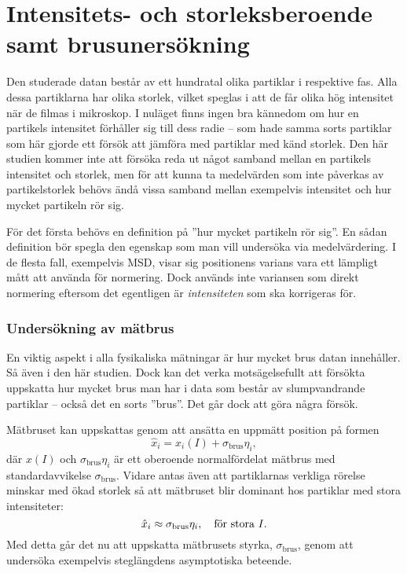 \section{Intensitets- och storleksberoende samt brusunersökning}

Den studerade datan består av ett hundratal olika partiklar i respektive fas. Alla dessa partiklarna har olika storlek, vilket speglas i att de får olika hög intensitet när de filmas i mikroskop. I nuläget finns ingen bra kännedom om hur en partikels intensitet förhåller sig till dess radie -- \cite{Parry_etal2014} som hade samma sorts partiklar som här gjorde ett försök att jämföra med partiklar med känd storlek. Den här studien kommer inte att försöka reda ut något samband mellan en partikels intensitet och storlek, men för att kunna ta medelvärden som inte påverkas av partikelstorlek behövs ändå vissa samband mellan exempelvis intensitet och hur mycket partikeln rör sig. 

För det första behövs en definition på ''hur mycket partikeln rör sig''. En sådan definition bör spegla den egenskap som man vill undersöka via medelvärdering. I de flesta fall, exempelvis MSD, visar sig positionens varians vara ett lämpligt mått att använda för normering. Dock används inte variansen som direkt normering eftersom det egentligen är \emph{intensiteten} som ska korrigeras för.

\subsubsection{Undersökning av mätbrus}
En viktig aspekt i alla fysikaliska mätningar är hur mycket brus datan innehåller. Så även i den här studien. Dock kan det verka motsägelsefullt att försökta uppskatta hur mycket brus man har i data som består av slumpvandrande partiklar -- också det en sorts ''brus''. Det går dock att göra några försök. 

Mätbruset kan uppskattas genom att ansätta en uppmätt position på formen
\begin{equation}
\hat{x}_i = x_i(I) + \sigma_\text{brus}\eta_i,
\end{equation}
där $x(I)$ och $\sigma_\text{brus}\eta_i$ är ett oberoende normalfördelat mätbrus med standardavvikelse $\sigma_\text{brus}$. Vidare antas även att partiklarnas verkliga rörelse minskar med ökad storlek så att mätbruset blir dominant hos partiklar med stora intensiteter:
\begin{equation}\label{eq:approx_noise}
\hat{x}_i \approx \sigma_\text{brus}\eta_i \qcomma \text{för stora } I.
\end{equation}
Med detta går det nu att uppskatta mätbrusets styrka, $\sigma_\text{brus}$, genom att undersöka exempelvis steglängdens asymptotiska beteende. 

